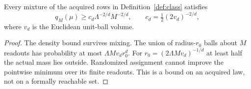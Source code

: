 \begin{lemma}\label{lem:smallball}
Every mixture of the acquired rows in Definition~\ref{def:class} satisfies
\begin{equation}\label{eq:smallball}
 q_M(\mu)\ge c_d\Lambda^{-2/d}M^{-2/d},\qquad
 c_d=\tfrac12(2v_d)^{-2/d},
\end{equation}
where $v_d$ is the Euclidean unit-ball volume.
\end{lemma}
\begin{proof}
The density bound survives mixing. The union of radius-$r_0$ balls about $M$ readouts has probability at most $\Lambda Mv_dr_0^d$. For $r_0=(2\Lambda Mv_d)^{-1/d}$ at least half the actual mass lies outside. Randomized assignment cannot improve the pointwise minimum over its finite readouts. This is a bound on an acquired law, not on a formally reachable set.
\end{proof}
